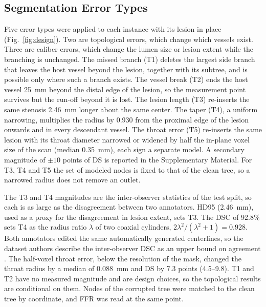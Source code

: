\documentclass[journal,twoside,web]{ieeecolor}
\begin{document}
\subsection{Segmentation Error Types}
Five error types were applied to each instance with its lesion in place (Fig.~\ref{fig:design}). Two are
topological errors, which change which vessels exist. Three are caliber errors, which change the lumen size or lesion
extent while the branching is unchanged. The missed branch (T1) deletes the largest side branch that leaves the host
vessel beyond the lesion, together with its subtree, and is possible only where such a branch exists. The vessel break (T2) ends the host vessel 25~mm beyond the
distal edge of the lesion, so the measurement point survives but the run-off beyond it is lost. The lesion length
(T3) re-inserts the same stenosis 2.46~mm longer about the same center. The taper (T4), a uniform narrowing, multiplies the radius by 0.930 from the proximal
edge of the lesion onwards and in every descendant vessel. The throat error (T5) re-inserts the same lesion with its throat diameter narrowed or widened by half the in-plane voxel size of the scan (median 0.35~mm), each sign a separate model. A secondary magnitude of $\pm 10$ points of DS is reported in the Supplementary Material. For T3, T4 and T5 the set of modeled nodes is fixed to that
of the clean tree, so a narrowed radius does not remove an outlet.

The T3 and T4 magnitudes are the inter-observer statistics of the test split, so each is as large as
the disagreement between two annotators. HD95 (2.46~mm), used as a proxy for the disagreement in lesion extent, sets T3. The DSC of 92.8\% sets T4 as the radius
ratio $\lambda$ of two coaxial cylinders, $2\lambda^2/(\lambda^2+1) = 0.928$. Both annotators edited the same automatically generated centerlines, so the dataset authors describe the inter-observer DSC as an upper bound on agreement \cite{bransby2026}. The half-voxel
throat error, below the resolution of the mask, changed the throat radius by a median of 0.088~mm and DS by 7.3 points (4.5--9.8). T1 and T2 have
no measured magnitude and are design choices, so the topological results are conditional on them. Nodes of the corrupted tree were matched to the clean tree by
coordinate, and FFR was read at the same point.
\end{document}
